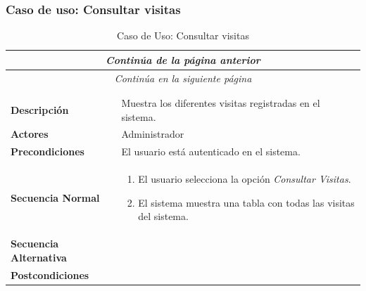 \newpage
\subsubsection*{Caso de uso: Consultar visitas }
\begin{longtable}{| p{4cm} | p{10cm} |}
\endfirsthead
\multicolumn{2}{c}{\textit{Continúa de la página anterior}}\\[12pt]
\hline
\endhead
\hline
\multicolumn{2}{c}{\textit{Continúa en la siguiente página}} \\
\endfoot
\hline
\caption{Caso de Uso: Consultar visitas}\label{fig:1}\\
\endlastfoot


\hline
\multicolumn{2}{|c|}{\textbf{CU$<$30$>$ - Consultar Visitas}} \\

\hline
\textbf{Descripción} &
Muestra los diferentes visitas registradas en el sistema.\\

\hline
\textbf{Actores} &
Administrador\\

\hline
\textbf{Precondiciones} &
El usuario está autenticado en el sistema.\\

\hline
\textbf{Secuencia Normal} &\mbox{}\par\vspace{-\baselineskip}
\begin{enumerate}[leftmargin=0.7cm, topsep=0.1cm]
\item El usuario selecciona la opción \textit{Consultar Visitas}.
\item El sistema muestra una tabla con todas las visitas del sistema.
\end{enumerate}


\\
\hline
\textbf{Secuencia Alternativa} &\mbox{}\par\vspace{-\baselineskip}
\\

\hline
\textbf{Postcondiciones} & \\
\hline
\end{longtable}



\newpage
